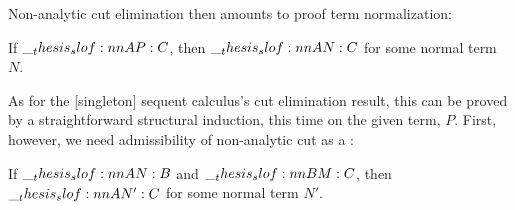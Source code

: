 Non-analytic cut elimination then amounts to proof term normalization:
%
\begin{theorem*}
  If $\slof{A |- P : C}$, then $\slof{A |- N : C}$ for some normal term $N$.
\end{theorem*}
%
As for the [singleton] sequent calculus's cut elimination result, this  can be proved by a straightforward structural induction, this time on the given term, $P$.
First, however, we need admissibility of non-analytic cut as a :
%
\begin{lemma}\label{lem:singleton-logic:hilbert:cut-admissibility}
  If $\slof{A |- N : B}$ and $\slof{B |- M : C}$, then $\slof{A |- N' : C}$ for some normal term $N'$.
\end{lemma}
%
